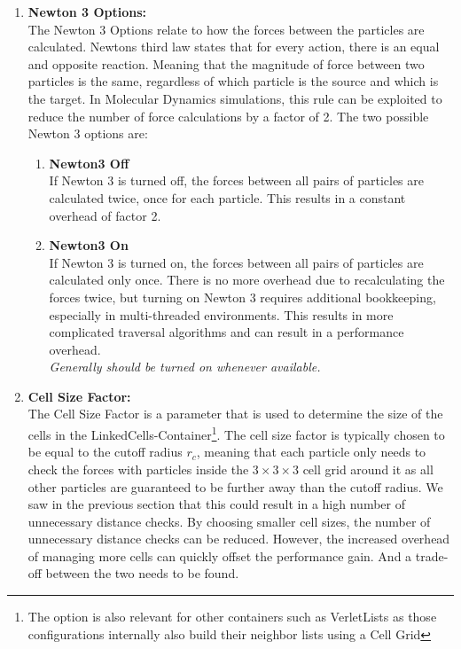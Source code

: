 \begin{enumerate}[label=\textbf{\arabic*.}]
      \item \textbf{Newton 3 Options:} \\
            The Newton 3 Options relate to how the forces between the particles are calculated. Newtons third law states that for every action, there is an equal and opposite reaction. Meaning that the magnitude of force between two particles is the same, regardless of which particle is the source and which is the target. In Molecular Dynamics simulations, this rule can be exploited to reduce the number of force calculations by a factor of 2. The two possible Newton 3 options are:
            \begin{enumerate}
                  \item \textbf{Newton3 Off} \\
                        If Newton 3 is turned off, the forces between all pairs of particles are calculated twice, once for each particle. This results in a constant overhead of factor 2.

                  \item \textbf{Newton3 On} \\
                        If Newton 3 is turned on, the forces between all pairs of particles are calculated only once. There is no more overhead due to recalculating the forces twice, but turning on Newton 3 requires additional bookkeeping, especially in multi-threaded environments. This results in more complicated traversal algorithms and can result in a performance overhead.\\
                        \textit{Generally should be turned on whenever available.}
            \end{enumerate}

      \item \textbf{Cell Size Factor:} \\
            The Cell Size Factor is a parameter that is used to determine the size of the cells in the LinkedCells-Container\footnote{The option is also relevant for other containers such as VerletLists as those configurations internally also build their neighbor lists using a Cell Grid}. The cell size factor is typically chosen to be equal to the cutoff radius $r_c$, meaning that each particle only needs to check the forces with particles inside the $3\times3\times3$ cell grid around it as all other particles are guaranteed to be further away than the cutoff radius. We saw in the previous section that this could result in a high number of unnecessary distance checks. By choosing smaller cell sizes, the number of unnecessary distance checks can be reduced. However, the increased overhead of managing more cells can quickly offset the performance gain. And a trade-off between the two needs to be found.

\end{enumerate}

